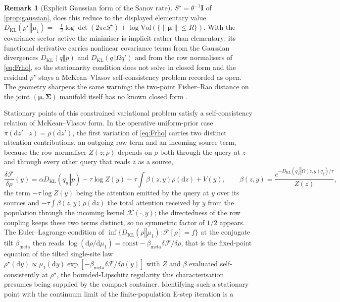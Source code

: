 \documentclass[11pt]{article}
\theoremstyle{plain}
\theoremstyle{definition}
\newtheorem{remark}{Remark}[section]
\newcommand{\KL}[2]{D_{\mathrm{KL}}\mathopen{}\left(#1 \mathbin{\Vert} #2\right)\mathclose{}}
\newcommand{\dd}{\mathrm{d}}
\newcommand{\bmu}{\boldsymbol{\mu}}
\newcommand{\bSigma}{\boldsymbol{\Sigma}}
\newcommand{\bI}{\mathbf{I}}
\newcommand{\Fcal}{\mathcal{F}}
\newcommand{\bmeta}{\beta_{\mathrm{meta}}}
\begin{document}
\begin{remark}[Explicit Gaussian form of the Sanov rate]
$S^{\star}=\theta^{-1}\bI$ of \cref{prop:gaussian}, does this reduce to the displayed elementary value
$\KL{\rho^{\star}}{\mu_1}=-\tfrac12\log\det(2\pi e S^{\star})+\log\mathrm{Vol}(\{\lVert\bmu\rVert\le R\})$. With the covariance sector active the minimiser is implicit rather than elementary: its functional
derivative carries nonlinear covariance terms from the Gaussian divergences $\KL{q}{p}$ and
$\KL{q}{\Omega q'}$ and from the row normalisers of \cref{eq:Frho}, so the stationarity condition
does not solve in closed form and the residual $\rho^{\star}$ stays a McKean--Vlasov self-consistency
problem recorded as open. The geometry sharpens the same warning: the two-point Fisher--Rao distance
on the joint $(\bmu,\bSigma)$ manifold itself has no known closed form
\citep{nielsen2020elementary,pinele2020fisher}.
\end{remark} Stationary points of this constrained variational problem satisfy a self-consistency
relation of McKean--Vlasov form. In the operative uniform-prior case $\pi(\dd z'\mid z)=\rho(\dd z')$,
the first variation of \cref{eq:Frho} carries two distinct attention contributions, an outgoing
row term and an incoming source term, because the row normaliser $Z(z;\rho)$ depends on $\rho$ both
through the query at $z$ and through every other query that reads $z$ as a source,
\begin{equation}
\label{eq:firstvar}
\frac{\delta\Fcal}{\delta\rho}(y)
=\alpha\KL{q_y}{p}
-\tau\log Z(y)
-\tau\int\beta(z,y)\rho(\dd z)
+V(y),
\qquad
\beta(z,y)=\frac{e^{-\KL{q_z}{\Omega(z,y)q_y}/\tau}}{Z(z)},
\end{equation}
the term $-\tau\log Z(y)$ being the attention emitted by the query at $y$ over its sources and
$-\tau\int\beta(z,y)\rho(\dd z)$ the total attention received by $y$ from the population through
the incoming kernel $\mathcal{K}(\cdot,y)$; the directedness of the row coupling keeps these two terms
distinct, so no symmetric factor of $1/2$ appears. The Euler--Lagrange condition of
$\inf\{\KL{\rho}{\mu_1}:\Fcal[\rho]=f\}$ at the conjugate tilt $\bmeta$ then reads
$\log(\dd\rho/\dd\mu_1)=\mathrm{const}-\bmeta\delta\Fcal/\delta\rho$, that is the fixed-point
equation of the tilted single-site law
$\rho^{\star}(\dd y)\propto\mu_1(\dd y)\exp[-\bmeta\delta\Fcal/\delta\rho(y)]$ with $Z$ and
$\beta$ evaluated self-consistently at $\rho^{\star}$, the bounded-Lipschitz regularity this
characterisation presumes being supplied by the compact container. Identifying such a
stationary point with the continuum limit of the finite-population E-step iteration is a
\end{document}
